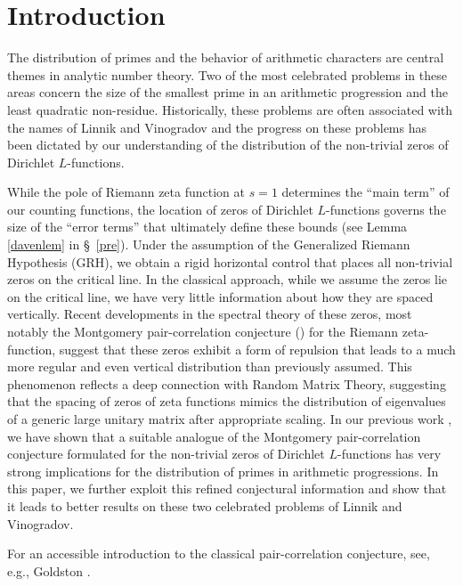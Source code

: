 \documentclass[pdflatex]{sn-jnl}%
\theoremstyle{sltheorems}
\theoremstyle{plainrem}
\theoremstyle{definition}
\begin{document}
\section{Introduction}
The distribution of primes and the behavior of arithmetic characters are central themes in analytic number theory. Two of the most celebrated problems in these 
areas concern the size of the smallest prime in an arithmetic progression and 
the least quadratic non-residue. Historically, these problems are often associated with the names of Linnik and Vinogradov and the progress on these problems has been dictated by our
understanding of the distribution of the non-trivial zeros of Dirichlet $L$-functions. 

While the pole of Riemann zeta function at $s=1$ determines the ``main term'' of our counting functions, the location of zeros of Dirichlet $L$-functions governs the size of the ``error terms'' that ultimately define these bounds (see Lemma \ref{davenlem} 
in \S~\ref{pre}). 
Under the assumption of the Generalized Riemann Hypothesis (GRH), we obtain a rigid horizontal control that places all non-trivial zeros on the critical line.
In the classical approach, while we assume the zeros lie on the critical line, we have very little information about how they are spaced vertically. 
Recent developments in the spectral theory of these zeros, most notably the Montgomery pair-correlation conjecture (\cite{Montgomery1973}) for the Riemann zeta-function, suggest that these zeros exhibit a form of repulsion that leads to a much more regular and even   vertical distribution than previously assumed. This phenomenon reflects a deep 
connection with Random Matrix Theory, suggesting that the spacing of zeros of zeta functions mimics the distribution of eigenvalues of a generic large unitary matrix after appropriate scaling. In our previous work \cite{mathannalen}, we have shown 
that a suitable analogue of the Montgomery pair-correlation conjecture formulated for the non-trivial zeros of Dirichlet $L$-functions
has very strong implications for the distribution of primes in arithmetic progressions.
In this paper,  we further exploit this refined conjectural
information and show that it leads to better results on
these two celebrated problems of Linnik and Vinogradov.
 
For an accessible introduction to the  classical pair-correlation conjecture, 
see, e.g., Goldston \cite{PCintro}.
\end{document}
